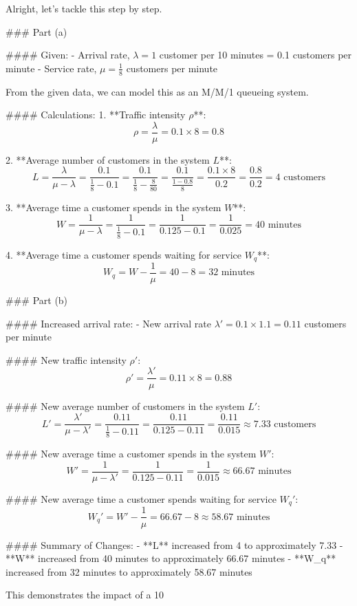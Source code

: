 Alright, let's tackle this step by step.

### Part (a)

#### Given:
- Arrival rate, \( \lambda = 1 \) customer per 10 minutes = 0.1 customers per minute
- Service rate, \( \mu = \frac{1}{8} \) customers per minute

From the given data, we can model this as an M/M/1 queueing system.

#### Calculations:
1. **Traffic intensity \( \rho \)**:
\[ \rho = \frac{\lambda}{\mu} = 0.1 \times 8 = 0.8 \]

2. **Average number of customers in the system \( L \)**:
\[ L = \frac{\lambda}{\mu - \lambda} = \frac{0.1}{\frac{1}{8} - 0.1} = \frac{0.1}{\frac{1}{8} - \frac{8}{80}} = \frac{0.1}{\frac{1 - 0.8}{8}} = \frac{0.1 \times 8}{0.2} = \frac{0.8}{0.2} = 4 \text{ customers} \]

3. **Average time a customer spends in the system \( W \)**:
\[ W = \frac{1}{\mu - \lambda} = \frac{1}{\frac{1}{8} - 0.1} = \frac{1}{0.125 - 0.1} = \frac{1}{0.025} = 40 \text{ minutes} \]

4. **Average time a customer spends waiting for service \( W_q \)**:
\[ W_q = W - \frac{1}{\mu} = 40 - 8 = 32 \text{ minutes} \]

### Part (b)

#### Increased arrival rate:
- New arrival rate \( \lambda' = 0.1 \times 1.1 = 0.11 \) customers per minute

#### New traffic intensity \( \rho' \):
\[ \rho' = \frac{\lambda'}{\mu} = 0.11 \times 8 = 0.88 \]

#### New average number of customers in the system \( L' \):
\[ L' = \frac{\lambda'}{\mu - \lambda'} = \frac{0.11}{\frac{1}{8} - 0.11} = \frac{0.11}{0.125 - 0.11} = \frac{0.11}{0.015} \approx 7.33 \text{ customers} \]

#### New average time a customer spends in the system \( W' \):
\[ W' = \frac{1}{\mu - \lambda'} = \frac{1}{0.125 - 0.11} = \frac{1}{0.015} \approx 66.67 \text{ minutes} \]

#### New average time a customer spends waiting for service \( W_q' \):
\[ W_q' = W' - \frac{1}{\mu} = 66.67 - 8 \approx 58.67 \text{ minutes} \]

#### Summary of Changes:
- **L** increased from 4 to approximately 7.33
- **W** increased from 40 minutes to approximately 66.67 minutes
- **W_q** increased from 32 minutes to approximately 58.67 minutes

This demonstrates the impact of a 10%